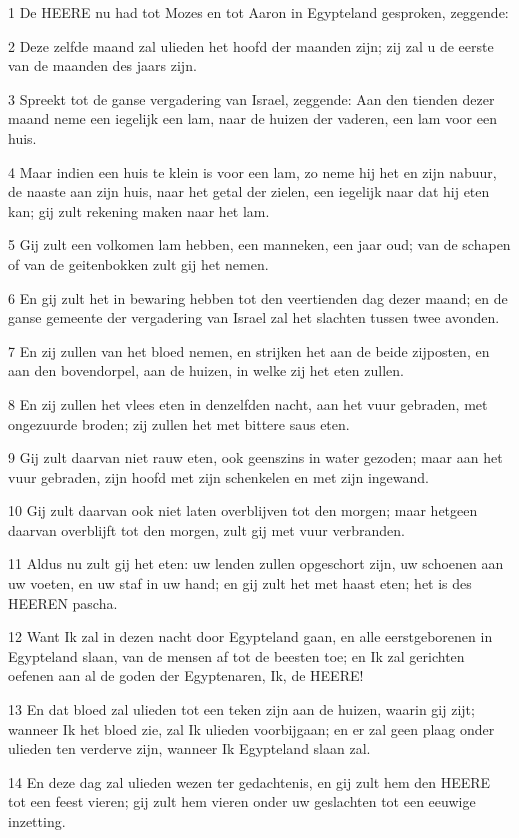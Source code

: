 \par 1 De HEERE nu had tot Mozes en tot Aaron in Egypteland gesproken, zeggende:
\par 2 Deze zelfde maand zal ulieden het hoofd der maanden zijn; zij zal u de eerste van de maanden des jaars zijn.
\par 3 Spreekt tot de ganse vergadering van Israel, zeggende: Aan den tienden dezer maand neme een iegelijk een lam, naar de huizen der vaderen, een lam voor een huis.
\par 4 Maar indien een huis te klein is voor een lam, zo neme hij het en zijn nabuur, de naaste aan zijn huis, naar het getal der zielen, een iegelijk naar dat hij eten kan; gij zult rekening maken naar het lam.
\par 5 Gij zult een volkomen lam hebben, een manneken, een jaar oud; van de schapen of van de geitenbokken zult gij het nemen.
\par 6 En gij zult het in bewaring hebben tot den veertienden dag dezer maand; en de ganse gemeente der vergadering van Israel zal het slachten tussen twee avonden.
\par 7 En zij zullen van het bloed nemen, en strijken het aan de beide zijposten, en aan den bovendorpel, aan de huizen, in welke zij het eten zullen.
\par 8 En zij zullen het vlees eten in denzelfden nacht, aan het vuur gebraden, met ongezuurde broden; zij zullen het met bittere saus eten.
\par 9 Gij zult daarvan niet rauw eten, ook geenszins in water gezoden; maar aan het vuur gebraden, zijn hoofd met zijn schenkelen en met zijn ingewand.
\par 10 Gij zult daarvan ook niet laten overblijven tot den morgen; maar hetgeen daarvan overblijft tot den morgen, zult gij met vuur verbranden.
\par 11 Aldus nu zult gij het eten: uw lenden zullen opgeschort zijn, uw schoenen aan uw voeten, en uw staf in uw hand; en gij zult het met haast eten; het is des HEEREN pascha.
\par 12 Want Ik zal in dezen nacht door Egypteland gaan, en alle eerstgeborenen in Egypteland slaan, van de mensen af tot de beesten toe; en Ik zal gerichten oefenen aan al de goden der Egyptenaren, Ik, de HEERE!
\par 13 En dat bloed zal ulieden tot een teken zijn aan de huizen, waarin gij zijt; wanneer Ik het bloed zie, zal Ik ulieden voorbijgaan; en er zal geen plaag onder ulieden ten verderve zijn, wanneer Ik Egypteland slaan zal.
\par 14 En deze dag zal ulieden wezen ter gedachtenis, en gij zult hem den HEERE tot een feest vieren; gij zult hem vieren onder uw geslachten tot een eeuwige inzetting.
